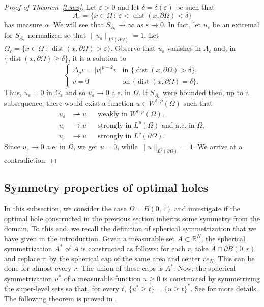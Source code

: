 \documentclass[11pt]{amsart}
\theoremstyle{remark}
\numberwithin{equation}{section}
\newcommand{\R}{\mathbb{R}}
\DeclareMathOperator{\dist}{dist}
\begin{document}
\begin{proof}[Proof of Theorem~\ref{t.sup}]
Let $\varepsilon>0$ and let $\delta=\delta(\varepsilon)$ be such that
\[
A_\varepsilon=\{x\in\Omega\ :\ \varepsilon<\dist(x,\partial\Omega)<\delta\}
\]
has measure $\alpha$. We will see that $S_{A_\varepsilon}\to\infty$ as $\varepsilon\to0$. In fact, let $u_\varepsilon$ be an extremal for $S_{A_\varepsilon}$ normalized so that $\|u_\varepsilon\|_{L^q(\partial\Omega)}=1$. Let $\Omega_\varepsilon=\{x\in\Omega\ :\ \dist(x,\partial\Omega)>\varepsilon\}$. Observe that $u_\varepsilon$ vanishes in $A_\varepsilon$ and, in $\{\dist(x,\partial\Omega)\ge\delta\}$, it is a solution to
\[
\begin{cases}
\Delta_pv=|v|^{p-2}v & \text{in }\{\dist(x,\partial\Omega)>\delta\},\\
v=0 & \text{on }\{\dist(x,\partial\Omega)=\delta\}.
\end{cases}
\]
Thus, $u_\varepsilon=0$ in $\Omega_\varepsilon$ and so $u_\varepsilon\to0$ a.e. in $\Omega$. If $S_{A_\varepsilon}$ were bounded then, up to a subsequence, there would exist a function $u\in W^{1,p}(\Omega)$ such that
\[
\begin{aligned}
u_\varepsilon&\rightharpoonup u &&\text{weakly in } W^{1,p}(\Omega),\\
u_\varepsilon&\to u &&\text{strongly in } L^p(\Omega)\text{ and a.e. in }\Omega,\\
u_\varepsilon&\to u &&\text{strongly in } L^q(\partial\Omega).
\end{aligned}
\]
Since $u_\varepsilon\to0$ a.e. in $\Omega$, we get $u=0$, while $\|u\|_{L^q(\partial\Omega)}=1$. We arrive at a contradiction.
\end{proof}

\subsection{Symmetry properties of optimal holes}\label{sec.sym}
In this subsection, we consider the case $\Omega=B(0,1)$ and investigate if the optimal hole constructed in the previous section inherits some symmetry from the domain. To this end, we recall the definition of spherical symmetrization that we have given in the introduction. Given a measurable set $A\subset\R^N$, the spherical symmetrization $A^*$ of $A$ is constructed as follows: for each $r$, take $A\cap\partial B(0,r)$ and replace it by the spherical cap of the same area and center $re_N$. This can be done for almost every $r$. The union of these caps is $A^*$. Now, the spherical symmetrization $u^*$ of a measurable function $u\ge0$ is constructed by symmetrizing the super-level sets so that, for every $t$, $\{u^*\ge t\}=\{u\ge t\}^*$. See \cite{Sp} for more details. The following theorem is proved in \cite{Sp}.
\end{document}
